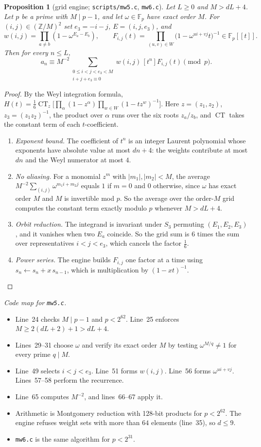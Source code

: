 \documentclass[11pt]{amsart}
\newtheorem{proposition}[theorem]{Proposition}
\theoremstyle{definition}
\theoremstyle{remark}
\newcommand{\Z}{\mathbb{Z}}
\newcommand{\F}{\mathbb{F}}
\newcommand{\CT}{\operatorname{CT}}
\begin{document}
\begin{proposition}[grid engine; \texttt{scripts/mw5.c}, \texttt{mw6.c}]\label{prop:grid}
Let $L\ge0$ and $M>dL+4$. Let $p$ be a prime with $M\mid p-1$, and let $\omega\in\F_p$ have exact order $M$. For $(i,j)\in(\Z/M)^2$ set $e_3=-i-j$, $E=(i,j,e_3)$, and
\[
w(i,j)=\prod_{a\ne b}(1-\omega^{E_a-E_b}),\qquad F_{i,j}(t)=\prod_{(u,v)\in W}\bigl(1-\omega^{ui+vj}t\bigr)^{-1}\in\F_p[[t]].
\]
Then for every $n\le L$,
\[
a_n\equiv M^{-2}\sum_{\substack{0\le i<j<e_3<M\\ i+j+e_3\equiv0}}w(i,j)\,[t^n]F_{i,j}(t)\pmod p.
\]
\end{proposition}
\begin{proof}
By the Weyl integration formula, $H(t)=\frac16\CT_{z}\bigl[\prod_{\alpha}(1-z^\alpha)\prod_{w\in W}(1-tz^w)^{-1}\bigr]$. Here $z=(z_1,z_2)$, $z_3=(z_1z_2)^{-1}$, the product over $\alpha$ runs over the six roots $z_a/z_b$, and $\CT$ takes the constant term of each $t$-coefficient.
\begin{enumerate}
\item \emph{Exponent bound.} The coefficient of $t^n$ is an integer Laurent polynomial whose exponents have absolute value at most $dn+4$: the weights contribute at most $dn$ and the Weyl numerator at most $4$.
\item \emph{No aliasing.} For a monomial $z^m$ with $|m_1|,|m_2|<M$, the average $M^{-2}\sum_{(i,j)}\omega^{m_1i+m_2j}$ equals $1$ if $m=0$ and $0$ otherwise, since $\omega$ has exact order $M$ and $M$ is invertible mod $p$. So the average over the order-$M$ grid computes the constant term exactly modulo $p$ whenever $M>dL+4$.
\item \emph{Orbit reduction.} The integrand is invariant under $S_3$ permuting $(E_1,E_2,E_3)$, and it vanishes when two $E_a$ coincide. So the grid sum is $6$ times the sum over representatives $i<j<e_3$, which cancels the factor $\tfrac16$.
\item \emph{Power series.} The engine builds $F_{i,j}$ one factor at a time using $s_n\leftarrow s_n+x\,s_{n-1}$, which is multiplication by $(1-xt)^{-1}$.
\end{enumerate}
\end{proof}

\emph{Code map for \texttt{mw5.c}.}
\begin{itemize}
\item Line~24 checks $M\mid p-1$ and $p<2^{62}$. Line~25 enforces $M\ge2(dL+2)+1>dL+4$.
\item Lines~29--31 choose $\omega$ and verify its exact order $M$ by testing $\omega^{M/q}\ne1$ for every prime $q\mid M$.
\item Line~49 selects $i<j<e_3$. Line~51 forms $w(i,j)$. Line~56 forms $\omega^{ui+vj}$. Lines~57--58 perform the recurrence.
\item Line~65 computes $M^{-2}$, and lines~66--67 apply it.
\item Arithmetic is Montgomery reduction with 128-bit products for $p<2^{62}$. The engine refuses weight sets with more than $64$ elements (line~35), so $d\le9$.
\item \texttt{mw6.c} is the same algorithm for $p<2^{31}$.
\end{itemize}
\end{document}
